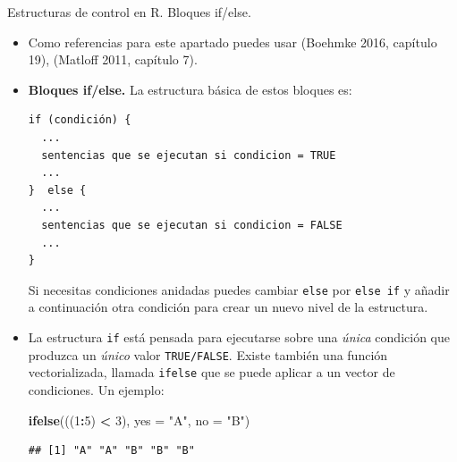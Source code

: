 \documentclass[
  9pt,
  ignorenonframetext,
]{beamer}
\newenvironment{Shaded}{\begin{snugshade}}{\end{snugshade}}
\newcommand{\DataTypeTok}[1]{\textcolor[rgb]{0.13,0.29,0.53}{#1}}
\newcommand{\DecValTok}[1]{\textcolor[rgb]{0.00,0.00,0.81}{#1}}
\newcommand{\KeywordTok}[1]{\textcolor[rgb]{0.13,0.29,0.53}{\textbf{#1}}}
\newcommand{\NormalTok}[1]{#1}
\newcommand{\OperatorTok}[1]{\textcolor[rgb]{0.81,0.36,0.00}{\textbf{#1}}}
\newcommand{\StringTok}[1]{\textcolor[rgb]{0.31,0.60,0.02}{#1}}
\begin{document}
\begin{frame}[fragile]{Estructuras de control en R. Bloques if/else.}
\protect\hypertarget{estructuras-de-control-en-r.-bloques-ifelse.}{}

\begin{itemize}
\item
  Como referencias para este apartado puedes usar (Boehmke 2016,
  capítulo 19), (Matloff 2011, capítulo 7).
\item
  \textbf{Bloques if/else.} La estructura básica de estos bloques
  es:\small

\begin{verbatim}
if (condición) {
  ...
  sentencias que se ejecutan si condicion = TRUE
  ...
}  else {
  ...
  sentencias que se ejecutan si condicion = FALSE
  ...
}
\end{verbatim}

  \normalsize Si necesitas condiciones anidadas puedes cambiar
  \texttt{else} por \texttt{else\ if} y añadir a continuación otra
  condición para crear un nuevo nivel de la estructura.
\item
  La estructura \texttt{if} está pensada para ejecutarse sobre una
  \emph{única} condición que produzca un \emph{único} valor
  \texttt{TRUE/FALSE}. Existe también una función vectorializada,
  llamada \texttt{ifelse} que se puede aplicar a un vector de
  condiciones. Un ejemplo:\small

\begin{Shaded}
\begin{Highlighting}[]
\KeywordTok{ifelse}\NormalTok{(((}\DecValTok{1}\OperatorTok{:}\DecValTok{5}\NormalTok{) }\OperatorTok{<}\StringTok{ }\DecValTok{3}\NormalTok{), }\DataTypeTok{yes =} \StringTok{"A"}\NormalTok{,  }\DataTypeTok{no =} \StringTok{"B"}\NormalTok{)}
\end{Highlighting}
\end{Shaded}

\begin{verbatim}
## [1] "A" "A" "B" "B" "B"
\end{verbatim}

  \normalsize
\end{itemize}

\end{frame}
\end{document}
